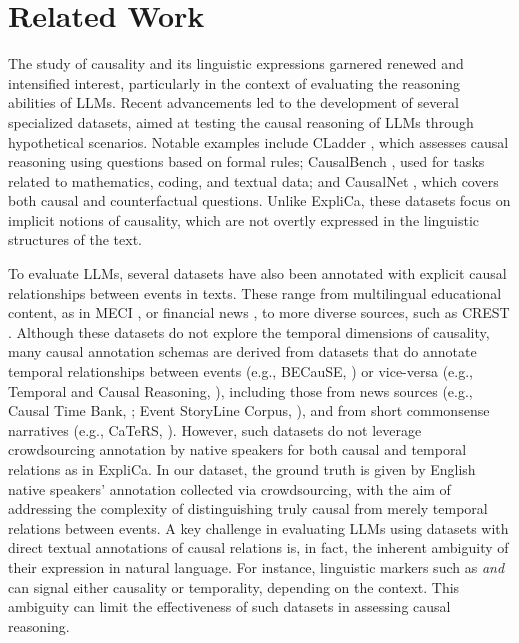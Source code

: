 \section{Related Work}
\label{related_work}

The study of causality and its linguistic expressions garnered renewed and intensified interest, particularly in the context of evaluating the reasoning abilities of LLMs. Recent advancements led to the development of several specialized datasets, aimed at testing the causal reasoning of LLMs through hypothetical scenarios. Notable examples include CLadder \cite{jin2023cladder}, which assesses causal reasoning using questions based on formal rules; CausalBench \cite{wang2024causalbench}, used for tasks related to mathematics, coding, and textual data; and CausalNet \cite{ashwani2024cause}, which covers both causal and counterfactual questions. Unlike ExpliCa, these datasets focus on implicit notions of causality, which are not overtly expressed in the linguistic structures of the text.

To evaluate LLMs, several datasets have also been annotated with explicit causal relationships between events in texts. 
These range from multilingual educational content, as in MECI \citep{lai2022meci}, or financial news \citep{mariko2022financial}, to more diverse sources, such as CREST \cite{hosseini2021predicting}. Although these datasets do not explore the temporal dimensions of causality, many causal annotation schemas are derived from datasets that do annotate temporal relationships between events (e.g., BECauSE, \citealt{dunietz2017because}) or vice-versa (e.g., Temporal and Causal Reasoning, \citealt{ning2018joint}), including those from news sources (e.g., Causal Time Bank, \citealt{mirza2014annotating}; Event StoryLine Corpus, \citealt{caselli2017event}), and from short commonsense narratives (e.g., CaTeRS, \citealt{mostafazadeh2016caters}). However, such datasets do not leverage crowdsourcing annotation by native speakers for both causal and temporal relations as in ExpliCa. In our dataset, the ground truth is given by English native speakers' annotation collected via crowdsourcing, with the aim of addressing the complexity of distinguishing truly causal from merely temporal relations between events.
A key challenge in evaluating LLMs using datasets with direct textual annotations of causal relations is, in fact, the inherent ambiguity of their expression in natural language. For instance, linguistic markers such as \emph{and} can signal either causality or temporality, depending on the context. This ambiguity can limit the effectiveness of such datasets in assessing causal reasoning. 


